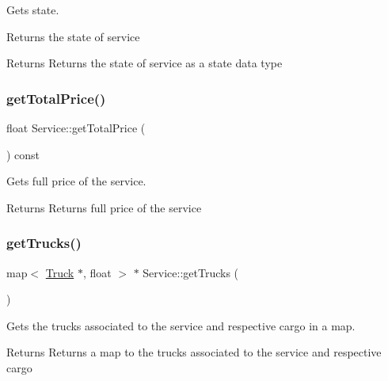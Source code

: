 Gets state. 

Returns the state of service

\begin{DoxyReturn}{Returns}
Returns the state of service as a state data type 
\end{DoxyReturn}
\mbox{\label{class_service_ac5dca2c1b78ff990827554d4ac9c5990}} 
\subsubsection{\texorpdfstring{get\+Total\+Price()}{getTotalPrice()}}
{\footnotesize\ttfamily float Service\+::get\+Total\+Price (\begin{DoxyParamCaption}{ }\end{DoxyParamCaption}) const}



Gets full price of the service. 

\begin{DoxyReturn}{Returns}
Returns full price of the service 
\end{DoxyReturn}
\mbox{\label{class_service_a48898f98adbbaec9d3a1cbdfd88b2137}} 
\subsubsection{\texorpdfstring{get\+Trucks()}{getTrucks()}}
{\footnotesize\ttfamily map$<$ \hyperlink{class_truck}{Truck} $\ast$, float $>$ $\ast$ Service\+::get\+Trucks (\begin{DoxyParamCaption}{ }\end{DoxyParamCaption})}



Gets the trucks associated to the service and respective cargo in a map. 

\begin{DoxyReturn}{Returns}
Returns a map to the trucks associated to the service and respective cargo 
\end{DoxyReturn}
\mbox{\label{class_service_a75f96cd94a42b604ff179343576e1bba}} 
